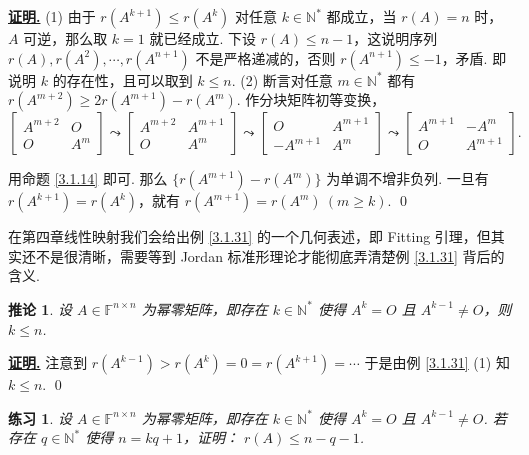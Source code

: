 \documentclass[10pt,openany]{article}
\theoremstyle{thmstyle} %
\newtheorem{practice}{练习}[section]
\theoremstyle{defstyle} %
\newtheorem{corollary}[theorem]{推论}
\theoremstyle{prostyle} %
\theoremstyle{exastyle}
\theoremstyle{remstyle}
\renewenvironment{proof}[1][证明]{\par\underline{\textbf{#1.}} \;\fangsong}{\qed\par}
\newcommand{\F}{\mathbb{F}}
\newcommand{\n}{^{n \times n}}
\begin{document}
\begin{proof}
	(1) 由于 \( r(A^{k+1}) \leq r(A^k) \) 对任意 \( k \in \mathbb{N}^* \) 都成立，当 \( r(A)=n \) 时，\( A \) 可逆，那么取 \( k=1 \) 就已经成立. 下设 \( r(A) \leq n-1 \)，这说明序列 \( r(A), r(A^2),\cdots,r(A^{n+1}) \) 不是严格递减的，否则 \( r(A^{n+1}) \leq -1 \)，矛盾. 即说明 \( k \) 的存在性，且可以取到 \( k \leq n \). (2) 断言对任意 \( m \in \mathbb{N}^* \) 都有 \( r(A^{m+2}) \geq 2r(A^{m+1})-r(A^m) \). 作分块矩阵初等变换，
	\[ \begin{bmatrix}
		A^{m+2} & O \\
		O & A^m
	\end{bmatrix} \leadsto \begin{bmatrix}
	A^{m+2} & A^{m+1} \\
	O & A^m
	\end{bmatrix} \leadsto \begin{bmatrix}
	O & A^{m+1} \\
	-A^{m+1} & A^m
	\end{bmatrix} \leadsto \begin{bmatrix}
	A^{m+1} & -A^m \\
	O & A^{m+1} 
	\end{bmatrix}. \]
	
	用命题 \ref{3.1.14} 即可. 那么 \( \{r(A^{m+1})-r(A^m)\} \) 为单调不增非负列. 一旦有 \( r(A^{k+1})=r(A^k) \)，就有 \( r(A^{m+1})=r(A^m) \ (m \geq k) \).
\end{proof}


在第四章线性映射我们会给出例 \ref{3.1.31} 的一个几何表述，即 Fitting 引理，但其实还不是很清晰，需要等到 Jordan 标准形理论才能彻底弄清楚例 \ref{3.1.31} 背后的含义.

\begin{corollary}
	设 \( A \in \F\n \) 为幂零矩阵，即存在 \( k \in \mathbb{N}^* \) 使得 \( A^k=O \) 且 \( A^{k-1} \neq O \)，则 \( k \leq n \).
\end{corollary}

\begin{proof}
	注意到 \( r(A^{k-1})>r(A^k)=0=r(A^{k+1})=\cdots \) 于是由例 \ref{3.1.31} (1) 知 \( k \leq n \).
\end{proof}

\begin{practice}
	设 \( A \in \F\n \) 为幂零矩阵，即存在 \( k \in \mathbb{N}^* \) 使得 \( A^k=O \) 且 \( A^{k-1} \neq O \). 若存在 \( q \in \mathbb{N}^* \) 使得 \( n=kq+1 \)，证明： \( r(A) \leq n-q-1 \).
\end{practice}
\end{document}
